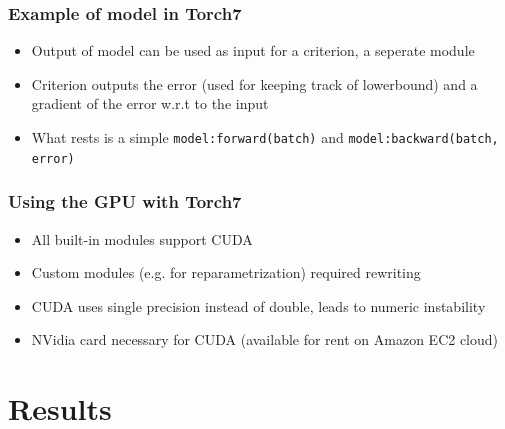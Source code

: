 \documentclass{beamer}
\begin{document}
\begin{frame}
\frametitle{Example of model in Torch7}

\begin{itemize}
	\item Output of model can be used as input for a criterion, a seperate module
	\item Criterion outputs the error (used for keeping track of lowerbound) and a gradient of the error w.r.t to the input
	\item What rests is a simple \texttt{model:forward(batch)} and \texttt{model:backward(batch, error)}
\end{itemize}

\end{frame}

\begin{frame}
\frametitle{Using the GPU with Torch7}

\begin{itemize}
	\item All built-in modules support CUDA
	\item Custom modules (e.g. for reparametrization) required rewriting
	\item CUDA uses single precision instead of double, leads to numeric instability
	\item NVidia card necessary for CUDA (available for rent on Amazon EC2 cloud)
\end{itemize}

\end{frame}

 
\section{Results}

\end{document}

